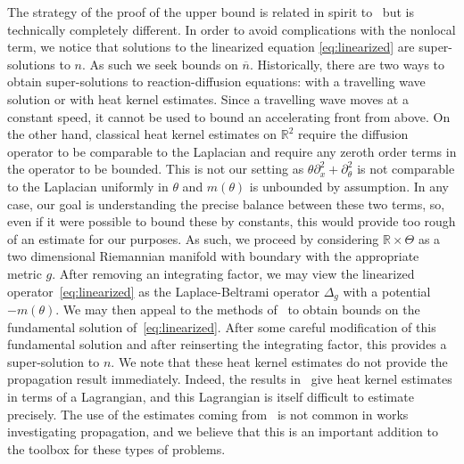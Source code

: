 \documentclass[11pt]{article}    %
\newcommand{\R}{\mathbb{R}}
\begin{document}
The strategy of the proof of the upper bound is related in spirit to~\cite{BHR_Acceleration} but is technically completely different. 
In order to avoid complications with the nonlocal term, we notice that solutions to the linearized equation \eqref{eq:linearized}
are super-solutions to $n$.  As such we seek bounds on $\overline n$.  Historically, there are two ways to obtain super-solutions to reaction-diffusion equations: with a travelling wave solution or with heat kernel estimates.  Since a travelling wave moves at a constant speed, it cannot be used to bound an accelerating front from above.  On the other hand, classical heat kernel estimates on $\R^2$ require the diffusion operator to be comparable to the Laplacian and require any zeroth order terms in the operator to be bounded.  This is not our setting as $\theta \partial_x^2 + \partial_\theta^2$ is not comparable to the Laplacian uniformly in $\theta$ and $m(\theta)$ is unbounded by assumption.  In any case, our goal is understanding the precise balance between these two terms, so, even if it were possible to bound these by constants, this would provide too rough of an estimate for our purposes.  As such, we proceed by considering $\R\times\Theta$ as a two dimensional Riemannian manifold with boundary with the appropriate metric $g$.  After removing an integrating factor, we may view the linearized operator~\eqref{eq:linearized} as the Laplace-Beltrami operator $\Delta_g$ with a potential $-m(\theta)$.  We may then appeal to the methods of~\cite{LiYau} to obtain bounds on the fundamental solution of~\eqref{eq:linearized}.  After some careful modification of this fundamental solution and after reinserting the integrating factor, this provides a super-solution to $n$. We note that these heat kernel estimates do not provide the propagation result immediately.  Indeed, the results in~\cite{LiYau} give heat kernel estimates in terms of a Lagrangian, and this Lagrangian is itself difficult to estimate precisely. 
The use of the estimates coming from~\cite{LiYau} is not common in works investigating propagation, and we believe that this is an important addition to the toolbox for these types of problems.
\end{document}
